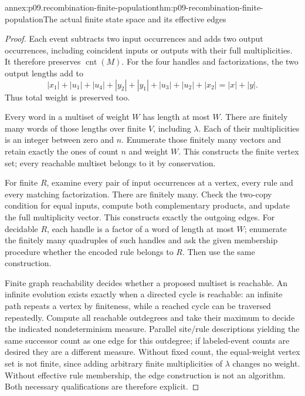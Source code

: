 \begin{annexitem}{annex:p09.recombination-finite-population}{thm:p09-recombination-finite-population}{The actual finite state space and its effective edges}
\begin{proof}
Each event subtracts two input occurrences and adds two output occurrences,
including coincident inputs or outputs with their full multiplicities.
It therefore preserves \(\operatorname{cnt}(M)\).
For the four handles and factorizations, the two output lengths add to
\[
 |x_1|+|u_1|+|u_4|+|y_2|
 +|y_1|+|u_3|+|u_2|+|x_2|=|x|+|y|.
\]
Thus total weight is preserved too.

Every word in a multiset of weight \(W\) has length at most \(W\).
There are finitely many words of those lengths over finite \(V\), including
\(\lambda\). Each of their multiplicities is an integer between zero
and \(n\). Enumerate those finitely many vectors and retain exactly the
ones of count \(n\) and weight \(W\). This constructs the finite vertex
set; every reachable multiset belongs to it by conservation.

For finite \(R\), examine every pair of input occurrences at a vertex,
every rule and every matching factorization. There are finitely many.
Check the two-copy condition for equal inputs, compute both complementary
products, and update the full multiplicity vector. This constructs exactly
the outgoing edges. For decidable \(R\), each handle is a factor of a
word of length at most \(W\); enumerate the finitely many quadruples of
such handles and ask the given membership procedure whether the encoded
rule belongs to \(R\). Then use the same construction.

Finite graph reachability decides whether a proposed multiset is reachable.
An infinite evolution exists exactly when a directed cycle is reachable:
an infinite path repeats a vertex by finiteness, while a reached cycle can
be traversed repeatedly. Compute all reachable outdegrees and take their
maximum to decide the indicated nondeterminism measure. Parallel site/rule
descriptions yielding the same successor count as one edge for this
outdegree; if labeled-event counts are desired they are a different measure.
Without fixed count, the equal-weight vertex set is not finite, since
adding arbitrary finite multiplicities of \(\lambda\) changes no weight.
Without effective rule membership, the edge construction is not an
algorithm. Both necessary qualifications are therefore explicit.
\end{proof}
\end{annexitem}
